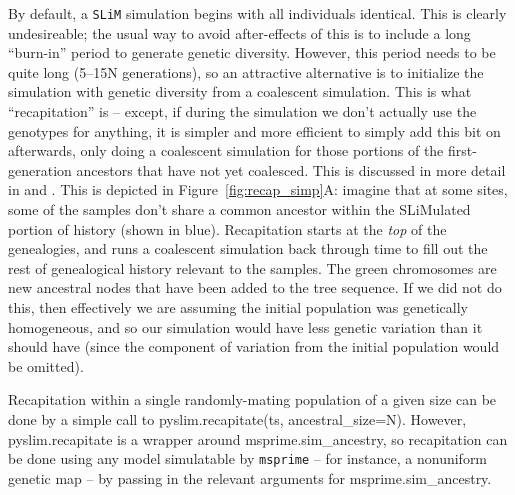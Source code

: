 \documentclass[12pt]{article}
\newcommand{\msprime}[0]{\texttt{msprime}\xspace}
\newcommand{\slim}[0]{\texttt{SLiM}\xspace}
\begin{document}
By default, a \slim simulation begins with all individuals identical.
This is clearly undesireable; the usual way to avoid after-effects of this
is to include a long ``burn-in'' period to generate genetic diversity.
However, this period needs to be quite long (5--15N generations),
so an attractive alternative is to initialize the simulation
with genetic diversity from a coalescent simulation.
This is what ``recapitation'' is --
except, if during the simulation we don't actually use the genotypes for anything,
it is simpler and more efficient to simply add this bit on afterwards,
only doing a coalescent simulation for those portions of the first-generation ancestors
that have not yet coalesced.
This is discussed in more detail in \citet{kelleher} and \citet{slim_manual}.
This is depicted in Figure~\ref{fig:recap_simp}A:
imagine that at some sites, some of the samples
don't share a common ancestor within the SLiMulated portion of history (shown in blue).
Recapitation starts at the \textit{top} of the genealogies,
and runs a coalescent simulation back through time
to fill out the rest of genealogical history relevant to the samples.
The green chromosomes are new ancestral nodes that have been added to the tree sequence.
If we did not do this,
then effectively we are assuming the initial population was genetically homogeneous,
and so our simulation would have less genetic variation than it should have
(since the component of variation from the initial population would be omitted).

Recapitation within a single randomly-mating population of a given size
can be done by a simple call to
pyslim.recapitate(ts, ancestral\_size=N). %
However, pyslim.recapitate is a wrapper around
msprime.sim\_ancestry, so recapitation can be done using any model simulatable by \msprime
\citep{baumdicker} --
for instance, a nonuniform genetic map --
by passing in the relevant arguments for msprime.sim\_ancestry.
\end{document}

